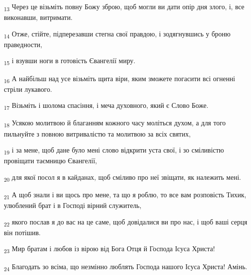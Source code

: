 \begin{tcolorbox}
\textsubscript{13} Через це візьміть повну Божу зброю, щоб могли ви дати опір дня злого, і, все виконавши, витримати.
\end{tcolorbox}
\begin{tcolorbox}
\textsubscript{14} Отже, стійте, підперезавши стегна свої правдою, і зодягнувшись у броню праведности,
\end{tcolorbox}
\begin{tcolorbox}
\textsubscript{15} і взувши ноги в готовість Євангелії миру.
\end{tcolorbox}
\begin{tcolorbox}
\textsubscript{16} А найбільш над усе візьміть щита віри, яким зможете погасити всі огненні стріли лукавого.
\end{tcolorbox}
\begin{tcolorbox}
\textsubscript{17} Візьміть і шолома спасіння, і меча духовного, який є Слово Боже.
\end{tcolorbox}
\begin{tcolorbox}
\textsubscript{18} Усякою молитвою й благанням кожного часу моліться духом, а для того пильнуйте з повною витривалістю та молитвою за всіх святих,
\end{tcolorbox}
\begin{tcolorbox}
\textsubscript{19} і за мене, щоб дане було мені слово відкрити уста свої, і зо сміливістю провіщати таємницю Євангелії,
\end{tcolorbox}
\begin{tcolorbox}
\textsubscript{20} для якої посол я в кайданах, щоб сміливо про неї звіщати, як належить мені.
\end{tcolorbox}
\begin{tcolorbox}
\textsubscript{21} А щоб знали і ви щось про мене, та що я роблю, то все вам розповість Тихик, улюблений брат і в Господі вірний служитель,
\end{tcolorbox}
\begin{tcolorbox}
\textsubscript{22} якого послав я до вас на це саме, щоб довідалися ви про нас, і щоб ваші серця він потішив.
\end{tcolorbox}
\begin{tcolorbox}
\textsubscript{23} Мир братам і любов із вірою від Бога Отця й Господа Ісуса Христа!
\end{tcolorbox}
\begin{tcolorbox}
\textsubscript{24} Благодать зо всіма, що незмінно люблять Господа нашого Ісуса Христа! Амінь.
\end{tcolorbox}
